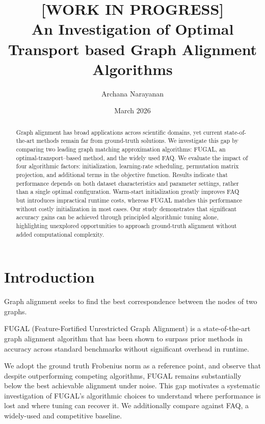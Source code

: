 \documentclass[11pt,a4paper]{article}
\title{%
  \textbf{[WORK IN PROGRESS] \\
  An Investigation of Optimal Transport based Graph Alignment Algorithms\\}
}
\author{Archana Narayanan}
\date{March 2026}
\begin{document}
\maketitle


\begin{abstract}
Graph alignment has broad applications across scientific domains, yet current state-of-the-art methods remain far from ground-truth solutions.
We investigate this gap by comparing two leading graph matching approximation algorithms: FUGAL, an optimal-transport–based method, and the widely used FAQ.
We evaluate the impact of four algorithmic factors: initialization, learning-rate scheduling, permutation matrix projection, and additional terms in the objective function.
Results indicate that performance depends on both dataset characteristics and parameter settings, rather than a single optimal configuration. Warm-start initialization greatly improves FAQ but introduces impractical runtime costs, whereas FUGAL matches this performance without costly initialization in most cases.
Our study demonstrates that significant accuracy gains can be achieved through principled algorithmic tuning alone, highlighting unexplored opportunities to approach ground-truth alignment without added computational complexity.





\end{abstract}


\section{Introduction}
\label{sec:intro}

 Graph alignment seeks to find the best correspondence between the nodes of two graphs.

 FUGAL (Feature-Fortified Unrestricted Graph Alignment) is a state-of-the-art graph alignment algorithm that has been shown to surpass
  prior methods in accuracy across standard benchmarks without significant overhead in runtime.


   We adopt
  the ground truth Frobenius norm as a reference point, and observe that despite outperforming competing algorithms, FUGAL remains
  substantially below the best achievable alignment under noise. This gap motivates a systematic investigation of FUGAL's algorithmic
  choices to understand where performance is lost and where tuning can recover it. We additionally compare against FAQ, a widely-used and competitive baseline.
\end{document}

